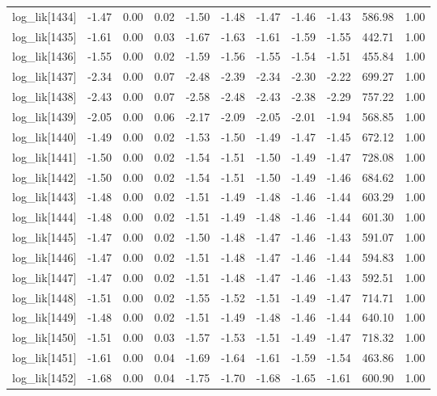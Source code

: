 \begin{table}[ht]
\begin{tabular}{rrrrrrrrrrr}
  log\_lik[1434] & -1.47 & 0.00 & 0.02 & -1.50 & -1.48 & -1.47 & -1.46 & -1.43 & 586.98 & 1.00 \\ 
  log\_lik[1435] & -1.61 & 0.00 & 0.03 & -1.67 & -1.63 & -1.61 & -1.59 & -1.55 & 442.71 & 1.00 \\ 
  log\_lik[1436] & -1.55 & 0.00 & 0.02 & -1.59 & -1.56 & -1.55 & -1.54 & -1.51 & 455.84 & 1.00 \\ 
  log\_lik[1437] & -2.34 & 0.00 & 0.07 & -2.48 & -2.39 & -2.34 & -2.30 & -2.22 & 699.27 & 1.00 \\ 
  log\_lik[1438] & -2.43 & 0.00 & 0.07 & -2.58 & -2.48 & -2.43 & -2.38 & -2.29 & 757.22 & 1.00 \\ 
  log\_lik[1439] & -2.05 & 0.00 & 0.06 & -2.17 & -2.09 & -2.05 & -2.01 & -1.94 & 568.85 & 1.00 \\ 
  log\_lik[1440] & -1.49 & 0.00 & 0.02 & -1.53 & -1.50 & -1.49 & -1.47 & -1.45 & 672.12 & 1.00 \\ 
  log\_lik[1441] & -1.50 & 0.00 & 0.02 & -1.54 & -1.51 & -1.50 & -1.49 & -1.47 & 728.08 & 1.00 \\ 
  log\_lik[1442] & -1.50 & 0.00 & 0.02 & -1.54 & -1.51 & -1.50 & -1.49 & -1.46 & 684.62 & 1.00 \\ 
  log\_lik[1443] & -1.48 & 0.00 & 0.02 & -1.51 & -1.49 & -1.48 & -1.46 & -1.44 & 603.29 & 1.00 \\ 
  log\_lik[1444] & -1.48 & 0.00 & 0.02 & -1.51 & -1.49 & -1.48 & -1.46 & -1.44 & 601.30 & 1.00 \\ 
  log\_lik[1445] & -1.47 & 0.00 & 0.02 & -1.50 & -1.48 & -1.47 & -1.46 & -1.43 & 591.07 & 1.00 \\ 
  log\_lik[1446] & -1.47 & 0.00 & 0.02 & -1.51 & -1.48 & -1.47 & -1.46 & -1.44 & 594.83 & 1.00 \\ 
  log\_lik[1447] & -1.47 & 0.00 & 0.02 & -1.51 & -1.48 & -1.47 & -1.46 & -1.43 & 592.51 & 1.00 \\ 
  log\_lik[1448] & -1.51 & 0.00 & 0.02 & -1.55 & -1.52 & -1.51 & -1.49 & -1.47 & 714.71 & 1.00 \\ 
  log\_lik[1449] & -1.48 & 0.00 & 0.02 & -1.51 & -1.49 & -1.48 & -1.46 & -1.44 & 640.10 & 1.00 \\ 
  log\_lik[1450] & -1.51 & 0.00 & 0.03 & -1.57 & -1.53 & -1.51 & -1.49 & -1.47 & 718.32 & 1.00 \\ 
  log\_lik[1451] & -1.61 & 0.00 & 0.04 & -1.69 & -1.64 & -1.61 & -1.59 & -1.54 & 463.86 & 1.00 \\ 
  log\_lik[1452] & -1.68 & 0.00 & 0.04 & -1.75 & -1.70 & -1.68 & -1.65 & -1.61 & 600.90 & 1.00 \\ 

\end{tabular}
\end{table}
